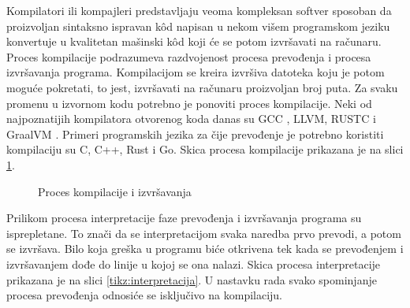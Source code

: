 \documentclass[12pt,oneside]{memoir}
\begin{document}
Kompilatori ili kompajleri predstavljaju veoma kompleksan softver sposoban da proizvoljan sintaksno ispravan k\^od napisan u nekom višem programskom jeziku konvertuje u kvalitetan mašinski k\^od koji će se potom izvršavati na računaru. Proces kompilacije podrazumeva razdvojenost procesa prevođenja i procesa izvršavanja programa. Kompilacijom se kreira izvršiva datoteka koju je potom moguće pokretati, to jest, izvršavati na računaru proizvoljan broj puta. Za svaku promenu u izvornom kodu potrebno je ponoviti proces kompilacije. Neki od najpoznatijih kompilatora otvorenog koda danas su GCC \cite{gcc}, LLVM, RUSTC \cite{rustc} i GraalVM \cite{graalvm}. Primeri programskih jezika za čije prevođenje je potrebno koristiti kompilaciju su C, C++, Rust i Go. Skica procesa kompilacije prikazana je na slici \ref{tikz:kompilacija}.

\begin{figure}
\centering

\caption{Proces kompilacije i izvršavanja}
\label{tikz:kompilacija}
\end{figure}


Prilikom procesa interpretacije faze prevođenja i izvršavanja programa su 
isprepletane. To znači da se interpretacijom svaka naredba prvo prevodi, a potom se izvršava. 
Bilo koja greška u programu biće otkrivena tek kada se prevođenjem i izvršavanjem dođe do linije u kojoj se ona nalazi. Skica procesa interpretacije prikazana je na slici \ref{tikz:interpretacija}. U nastavku rada svako spominjanje procesa prevođenja odnosiće se isključivo na kompilaciju.
\end{document}
